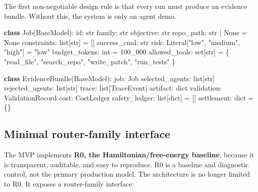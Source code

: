 \documentclass[
  11pt,
]{article}
\newenvironment{Shaded}{}{}
\newcommand{\BuiltInTok}[1]{\textcolor[rgb]{0.00,0.50,0.00}{#1}}
\newcommand{\DecValTok}[1]{\textcolor[rgb]{0.25,0.63,0.44}{#1}}
\newcommand{\KeywordTok}[1]{\textcolor[rgb]{0.00,0.44,0.13}{\textbf{#1}}}
\newcommand{\NormalTok}[1]{#1}
\newcommand{\OperatorTok}[1]{\textcolor[rgb]{0.40,0.40,0.40}{#1}}
\newcommand{\StringTok}[1]{\textcolor[rgb]{0.25,0.44,0.63}{#1}}
\newcommand{\VariableTok}[1]{\textcolor[rgb]{0.10,0.09,0.49}{#1}}
\begin{document}
The first non-negotiable design rule is that every run must produce an
evidence bundle. Without this, the system is only an agent demo.

\begin{Shaded}
\begin{Highlighting}[]
\KeywordTok{class}\NormalTok{ Job(BaseModel):}
    \BuiltInTok{id}\NormalTok{: }\BuiltInTok{str}
\NormalTok{    family: }\BuiltInTok{str}
\NormalTok{    objective: }\BuiltInTok{str}
\NormalTok{    repo\_path: }\BuiltInTok{str} \OperatorTok{|} \VariableTok{None} \OperatorTok{=} \VariableTok{None}
\NormalTok{    constraints: }\BuiltInTok{list}\NormalTok{[}\BuiltInTok{str}\NormalTok{] }\OperatorTok{=}\NormalTok{ []}
\NormalTok{    success\_cmd: }\BuiltInTok{str}
\NormalTok{    risk: Literal[}\StringTok{"low"}\NormalTok{, }\StringTok{"medium"}\NormalTok{, }\StringTok{"high"}\NormalTok{] }\OperatorTok{=} \StringTok{"low"}
\NormalTok{    budget\_tokens: }\BuiltInTok{int} \OperatorTok{=} \DecValTok{100\_000}
\NormalTok{    allowed\_tools: }\BuiltInTok{set}\NormalTok{[}\BuiltInTok{str}\NormalTok{] }\OperatorTok{=}\NormalTok{ \{}
        \StringTok{"read\_file"}\NormalTok{, }\StringTok{"search\_repo"}\NormalTok{,}
        \StringTok{"write\_patch"}\NormalTok{, }\StringTok{"run\_tests"}
\NormalTok{    \}}

\KeywordTok{class}\NormalTok{ EvidenceBundle(BaseModel):}
\NormalTok{    job: Job}
\NormalTok{    selected\_agents: }\BuiltInTok{list}\NormalTok{[}\BuiltInTok{str}\NormalTok{]}
\NormalTok{    rejected\_agents: }\BuiltInTok{list}\NormalTok{[}\BuiltInTok{str}\NormalTok{]}
\NormalTok{    trace: }\BuiltInTok{list}\NormalTok{[TraceEvent]}
\NormalTok{    artifact: }\BuiltInTok{dict}
\NormalTok{    validation: ValidationRecord}
\NormalTok{    cost: CostLedger}
\NormalTok{    safety\_ledger: }\BuiltInTok{list}\NormalTok{[}\BuiltInTok{dict}\NormalTok{] }\OperatorTok{=}\NormalTok{ []}
\NormalTok{    settlement: }\BuiltInTok{dict} \OperatorTok{=}\NormalTok{ \{\}}
\end{Highlighting}
\end{Shaded}

\subsection{Minimal router-family
interface}\label{minimal-router-family-interface}

The MVP implements \textbf{R0, the Hamiltonian/free-energy baseline},
because it is transparent, auditable, and easy to reproduce. R0 is a
baseline and diagnostic control, not the primary production model. The
architecture is no longer limited to R0. It exposes a router-family
interface:
\end{document}
